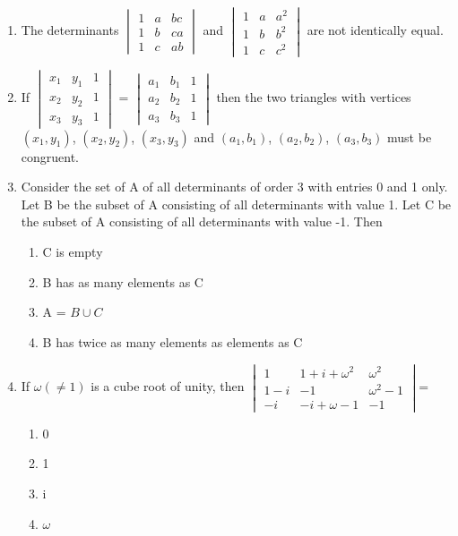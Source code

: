 \begin{enumerate}[label=\arabic*.,ref=\thesubsection.\theenumi]
\item The determinants $\begin{vmatrix} 1 & a & bc  \\ 1 & b & ca \\ 1 & c & ab \end{vmatrix}$ and $\begin{vmatrix} 1 & a & a^2  \\ 1 & b & b^2 \\ 1 & c & c^2 \end{vmatrix}$ are not identically equal.
\item If $\begin{vmatrix} x_1 & y_1 & 1  \\ x_2 & y_2 & 1 \\ x_3 & y_3 & 1 \end{vmatrix}$ = $\begin{vmatrix} a_1 & b_1 & 1  \\ a_2 & b_2 & 1 \\ a_3 & b_3 & 1 \end{vmatrix}$ then the two triangles with vertices $(x_1, y_1)$, $(x_2, y_2)$, $(x_3, y_3)$ and $(a_1, b_1)$, $(a_2, b_2)$, $(a_3, b_3)$ must be congruent.
\item Consider the set of A of all determinants of order 3 with entries 0 and 1 only. Let B be the subset of A consisting of all determinants with value 1. Let C be the subset of A consisting of all determinants with value -1. Then 
\begin{enumerate}
 \item C is empty
 \item B has as many elements as C
 \item A = $B\cup C$ 
 \item B has twice as many elements as elements as C
 \end{enumerate}
 \item If $\omega(\neq1)$ is a cube root of unity, then $\begin{vmatrix} 1 & 1+i+\omega^2 & \omega^2  \\ 1-i & -1 & \omega^2-1 \\ -i & -i+\omega -1 & -1 \end{vmatrix}$=
 \begin{enumerate}
 \item 0
 \item 1
 \item i
 \item $\omega$
 \end{enumerate}

\end{enumerate}
